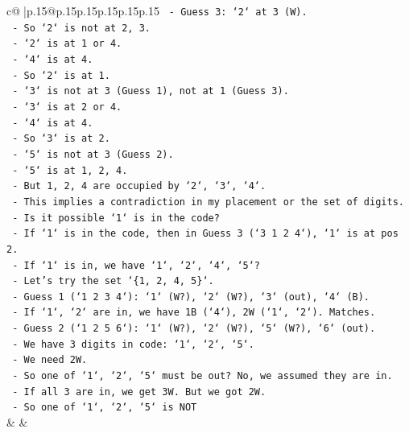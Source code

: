 \documentclass{article}
\begin{document}
{\begin{supertabular}{c@{$\;$}|p{.15\linewidth}@{}p{.15\linewidth}p{.15\linewidth}p{.15\linewidth}p{.15\linewidth}p{.15\linewidth}}
{{{\texttt{                        {-} Guess 3: `2` at 3 (W).} \\
\texttt{                        {-} So `2` is not at 2, 3.} \\
\texttt{                        {-} `2` is at 1 or 4.} \\
\texttt{                        {-} `4` is at 4.} \\
\texttt{                        {-} So `2` is at 1.} \\
\texttt{                        {-} `3` is not at 3 (Guess 1), not at 1 (Guess 3).} \\
\texttt{                        {-} `3` is at 2 or 4.} \\
\texttt{                        {-} `4` is at 4.} \\
\texttt{                        {-} So `3` is at 2.} \\
\texttt{                        {-} `5` is not at 3 (Guess 2).} \\
\texttt{                        {-} `5` is at 1, 2, 4.} \\
\texttt{                        {-} But 1, 2, 4 are occupied by `2`, `3`, `4`.} \\
\texttt{                        {-} This implies a contradiction in my placement or the set of digits.} \\
\texttt{                        {-} Is it possible `1` is in the code?} \\
\texttt{                        {-} If `1` is in the code, then in Guess 3 (`3 1 2 4`), `1` is at pos 2.} \\
\texttt{                        {-} If `1` is in, we have `1`, `2`, `4`, `5`?} \\
\texttt{                        {-} Let's try the set `\{1, 2, 4, 5\}`.} \\
\texttt{                        {-} Guess 1 (`1 2 3 4`): `1` (W?), `2` (W?), `3` (out), `4` (B).} \\
\texttt{                            {-} If `1`, `2` are in, we have 1B (`4`), 2W (`1`, `2`). Matches.} \\
\texttt{                        {-} Guess 2 (`1 2 5 6`): `1` (W?), `2` (W?), `5` (W?), `6` (out).} \\
\texttt{                            {-} We have 3 digits in code: `1`, `2`, `5`.} \\
\texttt{                            {-} We need 2W.} \\
\texttt{                            {-} So one of `1`, `2`, `5` must be out? No, we assumed they are in.} \\
\texttt{                            {-} If all 3 are in, we get 3W. But we got 2W.} \\
\texttt{                            {-} So one of `1`, `2`, `5` is NOT} \\
            }
        }
    }
    & & \\ \\


\end{supertabular}}
\end{document}
